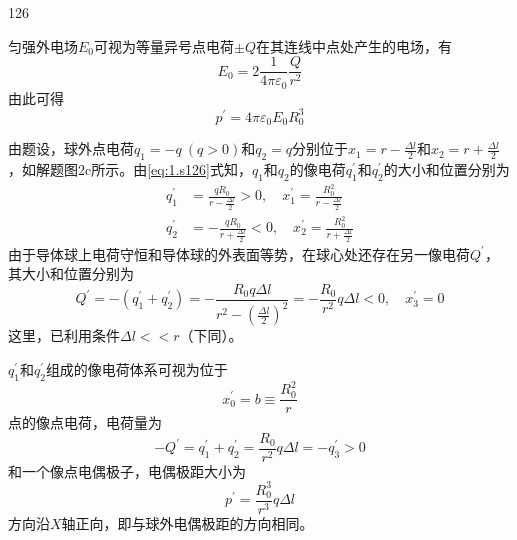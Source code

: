 \begin{solution}{126}
\begin{subsolution}
\begin{equation}
            \label{eq:4.s126}
        \end{equation}
        匀强外电场$E _ { 0 }$可视为等量异号点电荷$\pm Q$在其连线中点处产生的电场，有
        \begin{equation}
            E _ {0} = 2 \frac {1}{4 \pi \varepsilon_ {0}} \frac {Q}{r ^ {2}}
            \label{eq:5.s126}
        \end{equation}
        由此可得
        \begin{equation}
            p ^ {\prime} = 4 \pi \varepsilon_ {0} E _ {0} R _ {0} ^ {3}
            \label{eq:6.s126}
        \end{equation}
    \end{subsolution}
    \begin{subsolution}
        由题设，球外点电荷$q _ { 1 } = - q \ ( q > 0 )$和$q _ { 2 } = q$分别位于$x _ { 1 } = r - \frac { \Delta l } { 2 }$和$x _ { 2 } = r + \frac { \Delta l } { 2 }$，如解题图2c所示。由\eqref{eq:1.s126}式知，$q _ { 1 }$和$q _ { 2 }$的像电荷$q _ { 1 } ^ { \prime }$和$q _ { 2 } ^ { \prime }$的大小和位置分别为
        \begin{align}
            q _ {1} ^ {\prime} &= \frac {q R _ {0}}{r - \frac {\Delta l}{2}} > 0, \quad x _ {1} ^ {\prime} = \frac {R _ {0} ^ {2}}{r - \frac {\Delta l}{2}} \label{eq:7.s126} \\
            q _ {2} ^ {\prime} &= - \frac {q R _ {0}}{r + \frac {\Delta l}{2}} < 0, \quad x _ {2} ^ {\prime} = \frac {R _ {0} ^ {2}}{r + \frac {\Delta l}{2}} \label{eq:8.s126}
        \end{align}
        由于导体球上电荷守恒和导体球的外表面等势，在球心处还存在另一像电荷$Q ^ { \prime }$，其大小和位置分别为
        \begin{equation}
            Q ^ {\prime} = - \left(q _ {1} ^ {\prime} + q _ {2} ^ {\prime}\right) = - \frac {R _ {0} q \Delta l}{r ^ {2} - \left(\frac {\Delta l}{2}\right) ^ {2}} = - \frac {R _ {0}}{r ^ {2}} q \Delta l < 0, \quad x _ {3} ^ {\prime} = 0
            \label{eq:9.s126}
        \end{equation}
        这里，已利用条件$\Delta l << r$（下同）。

        $q _ { 1 } ^ { \prime }$和$q _ { 2 } ^ { \prime }$组成的像电荷体系可视为位于
        \begin{equation}
            x _ {0} ^ {\prime} = b \equiv \frac {R _ {0} ^ {2}}{r}
            \label{eq:10.s126}
        \end{equation}
        点的像点电荷，电荷量为
        \begin{equation}
            - Q ^ {\prime} = q _ {1} ^ {\prime} + q _ {2} ^ {\prime} = \frac {R _ {0}}{r ^ {2}} q \Delta l = - q _ {3} ^ {\prime} > 0
            \label{eq:11.s126}
        \end{equation}
        和一个像点电偶极子，电偶极距大小为
        \begin{equation}
            p ^ {\prime} = \frac {R _ {0} ^ {3}}{r ^ {3}} q \Delta l
            \label{eq:12.s126}
        \end{equation}
        方向沿$X$轴正向，即与球外电偶极距的方向相同。


\end{subsolution}
\end{solution}
